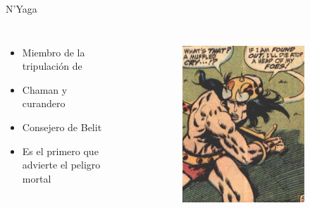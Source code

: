 \begin{frame}{N'Yaga}
	\begin{columns}
		\begin{itemize}
			\item Miembro de la tripulación de 
			\item Chaman y curandero
			\item Consejero de Belit
			\item Es el primero que advierte el peligro mortal
		\end{itemize}
		\begin{figure}[htp]
			\centering
			\begin{subfigure}[b]{0.3\textwidth}
				\includegraphics[width=\textwidth]{img/conan/CTB}
			\end{subfigure}
			~
			\begin{subfigure}[b]{0.27\textwidth}

\end{subfigure}
\end{figure}
\end{columns}
\end{frame}
